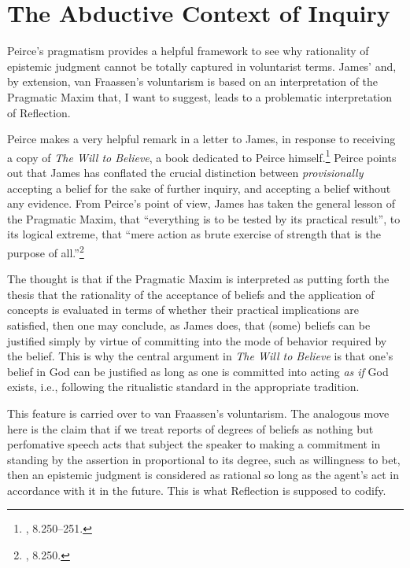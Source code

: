 \hypertarget{the-abductive-context-of-inquiry}{%
\section{The Abductive Context of
Inquiry}\label{the-abductive-context-of-inquiry}}

Peirce's pragmatism provides a helpful framework to see why rationality
of epistemic judgment cannot be totally captured in voluntarist terms.
James' and, by extension, van Fraassen's voluntarism is based on an
interpretation of the Pragmatic Maxim that, I want to suggest, leads to
a problematic interpretation of Reflection.

Peirce makes a very helpful remark in a letter to James, in response to
receiving a copy of \emph{The Will to Believe}, a book dedicated to
Peirce himself.\footnote{\cite{CP}, 8.250--251.} Peirce points out that James has
conflated the crucial distinction between \emph{provisionally} accepting
a belief for the sake of further inquiry, and accepting a belief without
any evidence. From Peirce's point of view, James has taken the general
lesson of the Pragmatic Maxim, that ``everything is to be tested by its
practical result'', to its logical extreme, that ``mere action as brute
exercise of strength that is the purpose of all.''\footnote{\cite{CP},
  8.250.}

The thought is that if the Pragmatic Maxim is interpreted as putting forth the thesis that the rationality of the acceptance of beliefs and the application of
concepts is evaluated in terms of whether their practical implications
are satisfied, then one may conclude, as James does, that (some) beliefs
can be justified simply by virtue of committing into the mode of
behavior required by the belief. This is why the central argument in
\emph{The Will to Believe} is that one's belief in God can be justified
as long as one is committed into acting \emph{as if} God exists, i.e., following the ritualistic standard in the appropriate tradition.

This feature is carried over to van Fraassen's voluntarism. The
analogous move here is the claim that if we treat reports of degrees of
beliefs as nothing but perfomative speech acts that subject the speaker
to making a commitment in standing by the assertion in proportional to
its degree, such as willingness to bet, then an epistemic judgment is
considered as rational so long as the agent's act in accordance with it in
the future. This is what Reflection is supposed to codify.

